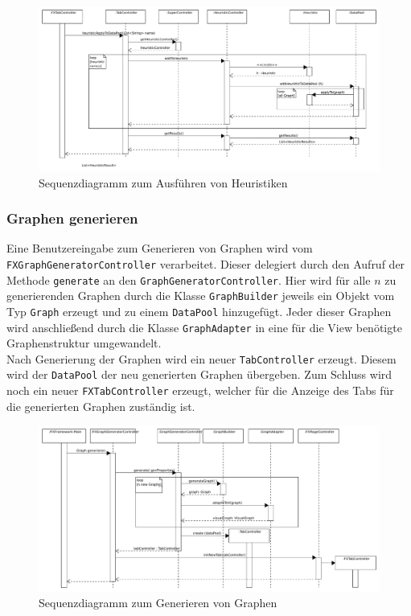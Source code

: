 	\begin{figure}
	\centering
\includegraphics[width=\textwidth]{abbildungen/heuristik-seq.pdf}
\caption{Sequenzdiagramm zum Ausführen von Heuristiken }
	\label{img:heuristic-seq}
	\end{figure}
\subsubsection{Graphen generieren}
Eine Benutzereingabe zum Generieren von Graphen wird vom \texttt{FXGraphGeneratorController} verarbeitet. Dieser delegiert durch den Aufruf der Methode \texttt{generate} an den \texttt{GraphGeneratorController}. Hier wird für alle $n$ zu generierenden Graphen durch die Klasse \texttt{GraphBuilder} jeweils ein Objekt vom Typ \texttt{Graph} erzeugt und zu einem \texttt{DataPool} hinzugefügt. Jeder dieser Graphen wird anschließend durch die Klasse \texttt{GraphAdapter} in eine für die View benötigte Graphenstruktur umgewandelt.\\
Nach Generierung der Graphen wird ein neuer \texttt{TabController} erzeugt. Diesem wird der \texttt{DataPool} der neu generierten Graphen übergeben. Zum Schluss wird noch ein neuer \texttt{FXTabController} erzeugt, welcher für die Anzeige des Tabs für die generierten Graphen zuständig ist.

\begin{figure}
	\centering
\includegraphics[width=\textwidth]{abbildungen/graphgen-seq.pdf}
\caption{Sequenzdiagramm zum Generieren von Graphen }
	\label{img:graphgen-seq}
	\end{figure}
	
